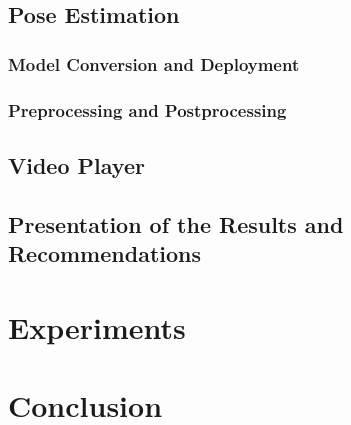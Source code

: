 


\section{Pose Estimation}
\label{pose_estimation}

\subsection{Model Conversion and Deployment}

\subsection{Preprocessing and Postprocessing}



\section{Video Player}
\label{video_player}

\section{Presentation of the Results and Recommendations}





\chapter{Experiments}
\label{experiments}


\chapter{Conclusion}
\label{conclusion}




% 